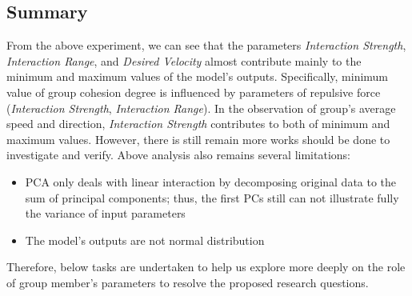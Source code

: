 \documentclass[a4paper,11pt,phdthesis,singlespace,twoside]{cssethesis}
\begin{document}
\subsection{Summary}
From the above experiment, we can see that the parameters \textit{Interaction Strength}, \textit{Interaction Range}, and \textit{Desired Velocity} almost contribute mainly to the minimum and maximum values of the model's outputs. Specifically, minimum value of group cohesion degree is influenced by parameters of repulsive force (\textit{Interaction Strength}, \textit{Interaction Range}). In the observation of group's average speed and direction, \textit{Interaction Strength} contributes to both of minimum and maximum values. However, there is still remain more works should be done to investigate and verify. Above analysis also remains several limitations:
\begin{itemize}
	\item PCA only deals with linear interaction by decomposing original data to the sum of principal components; thus, the first PCs still can not illustrate fully the variance of input parameters
	\item The model's outputs are not normal distribution 
\end{itemize}
Therefore, below tasks are undertaken to help us explore more deeply on the role of group member's parameters to resolve the proposed research questions.
\end{document}
